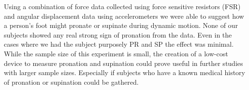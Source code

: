 Using a combination of force data collected using force sensitive resistors (FSR) and angular displacement data using accelerometers we were able to suggest how a person's foot might pronate or supinate during dynamic motion.
None of our subjects showed any real strong sign of pronation from the data.
Even in the cases where we had the subject purposely PR and SP the effect was minimal.
While the sample size of this experiment is small, the creation of a low-cost device to measure pronation and supination could prove useful in further studies with larger sample sizes.
Especially if subjects who have a known medical history of pronation or supination could be gathered.
